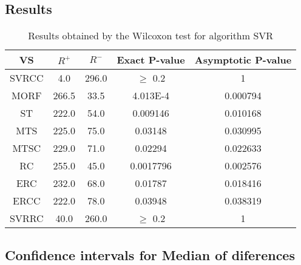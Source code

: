 \documentclass[a4paper,10pt]{article}
\begin{document}
\subsection{Results}

\begin{table}[!htp]
\centering\small
\begin{tabular}{
|c|c|c|c|c|}
\hline
 VS & $R^{+}$ & $R^{-}$ & Exact P-value & Asymptotic P-value \\ \hline 
SVRCC & 4.0 & 296.0 & $\geq$ 0.2 & 1\\ \hline 
MORF & 266.5 & 33.5 & 4.013E-4 & 0.000794\\ \hline 
ST & 222.0 & 54.0 & 0.009146 & 0.010168\\ \hline 
MTS & 225.0 & 75.0 & 0.03148 & 0.030995\\ \hline 
MTSC & 229.0 & 71.0 & 0.02294 & 0.022633\\ \hline 
RC & 255.0 & 45.0 & 0.0017796 & 0.002576\\ \hline 
ERC & 232.0 & 68.0 & 0.01787 & 0.018416\\ \hline 
ERCC & 222.0 & 78.0 & 0.03948 & 0.038319\\ \hline 
SVRRC & 40.0 & 260.0 & $\geq$ 0.2 & 1\\ \hline 

\end{tabular}
\caption{Results obtained by the Wilcoxon test for algorithm SVR}
\end{table}

\subsection{Confidence intervals for Median of diferences}
\end{document}

